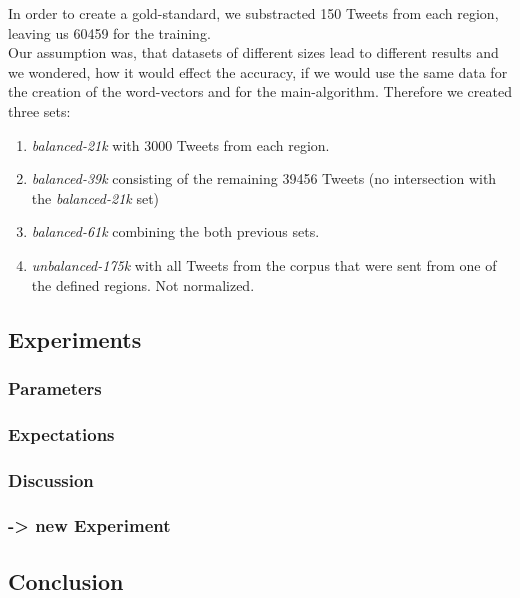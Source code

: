 \documentclass[../Main.tex]{subfiles}
\begin{document}
In order to create a gold-standard, we substracted 150 Tweets from each region, leaving us 60459 for the training. \\
Our assumption was, that datasets of different sizes lead to different results and we wondered, how it would effect the accuracy, if we would use the same data for the creation of the word-vectors and for the main-algorithm. Therefore we created three sets:
\begin{enumerate}
\item \emph{balanced-21k} with 3000 Tweets from each region.
\item \emph{balanced-39k} consisting of the remaining 39456 Tweets (no intersection with the \emph{balanced-21k} set)
\item \emph{balanced-61k} combining the both previous sets. 
\item \emph{unbalanced-175k} with all Tweets from the corpus that were sent from one of the defined regions. Not normalized.
\end{enumerate}
\subsection{Experiments}


\newpage

\subsubsection{Parameters}
\subsubsection{Expectations}
\subsubsection{Discussion}
\subsubsection{-> new Experiment}
\subsection{Conclusion}
\end{document}

